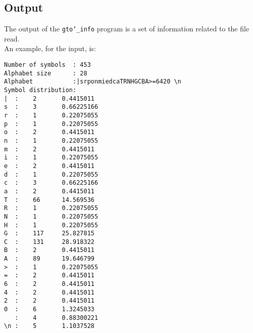 \subsection*{Output}
The output of the \texttt{gto\char`_info} program is a set of information related to the file read. \\
An example, for the input, is:
\begin{lstlisting}
Number of symbols  : 453
Alphabet size      : 28
Alphabet           :|srponmiedcaTRNHGCBA>=6420 \n
Symbol distribution:
|  : 	2		0.4415011
s  : 	3		0.66225166
r  : 	1		0.22075055
p  : 	1		0.22075055
o  : 	2		0.4415011
n  : 	1		0.22075055
m  : 	2		0.4415011
i  : 	1		0.22075055
e  : 	2		0.4415011
d  : 	1		0.22075055
c  : 	3		0.66225166
a  : 	2		0.4415011
T  : 	66		14.569536
R  : 	1		0.22075055
N  : 	1		0.22075055
H  : 	1		0.22075055
G  : 	117		25.827815
C  : 	131		28.918322
B  : 	2		0.4415011
A  : 	89		19.646799
>  : 	1		0.22075055
=  : 	2		0.4415011
6  : 	2		0.4415011
4  : 	2		0.4415011
2  : 	2		0.4415011
0  : 	6		1.3245033
   : 	4		0.88300221
\n : 	5		1.1037528
\end{lstlisting}
